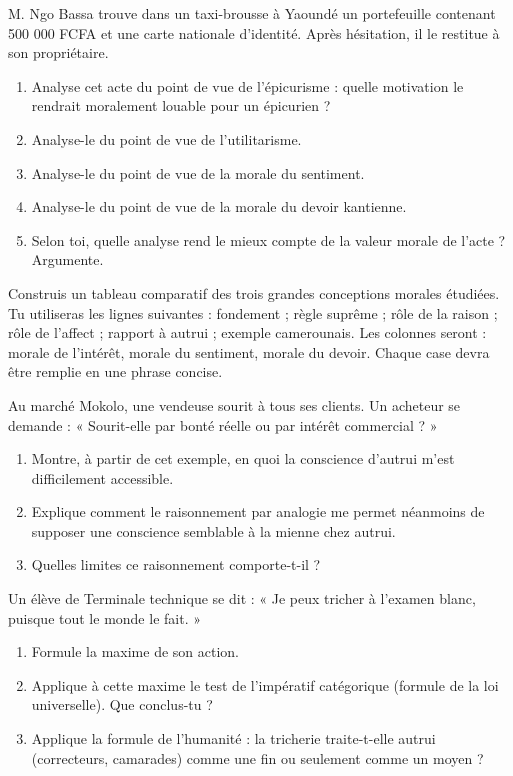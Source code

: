 \documentclass[11pt]{article}
\newcommand{\cle}[1]{{\popxbold\color{popdark}#1}}
\begin{document}
\begin{exercice}
M. Ngo Bassa trouve dans un taxi-brousse à Yaoundé un portefeuille contenant 500 000 FCFA et une carte nationale d'identité. Après hésitation, il le restitue à son propriétaire.
\begin{enumerate}
\item Analyse cet acte du point de vue de l'épicurisme : quelle motivation le rendrait moralement louable pour un épicurien ?
\item Analyse-le du point de vue de l'utilitarisme.
\item Analyse-le du point de vue de la morale du sentiment.
\item Analyse-le du point de vue de la morale du devoir kantienne.
\item Selon toi, quelle analyse rend le mieux compte de la valeur morale de l'acte ? Argumente.
\end{enumerate}
\end{exercice}

\begin{exercice}
Construis un tableau comparatif des trois grandes conceptions morales étudiées. Tu utiliseras les lignes suivantes : fondement ; règle suprême ; rôle de la raison ; rôle de l'affect ; rapport à autrui ; exemple camerounais. Les colonnes seront : morale de l'intérêt, morale du sentiment, morale du devoir. Chaque case devra être remplie en une phrase concise.
\end{exercice}

\begin{exercice}
Au marché Mokolo, une vendeuse sourit à tous ses clients. Un acheteur se demande : « Sourit-elle par bonté réelle ou par intérêt commercial ? »
\begin{enumerate}
\item Montre, à partir de cet exemple, en quoi la conscience d'autrui m'est difficilement accessible.
\item Explique comment le raisonnement par analogie me permet néanmoins de supposer une conscience semblable à la mienne chez autrui.
\item Quelles limites ce raisonnement comporte-t-il ?
\end{enumerate}
\end{exercice}

\begin{exercice}
Un élève de Terminale technique se dit : « Je peux tricher à l'examen blanc, puisque tout le monde le fait. »
\begin{enumerate}
\item Formule la \cle{maxime} de son action.
\item Applique à cette maxime le test de l'impératif catégorique (formule de la loi universelle). Que conclus-tu ?
\item Applique la formule de l'humanité : la tricherie traite-t-elle autrui (correcteurs, camarades) comme une fin ou seulement comme un moyen ?
\end{enumerate}
\end{exercice}
\end{document}
